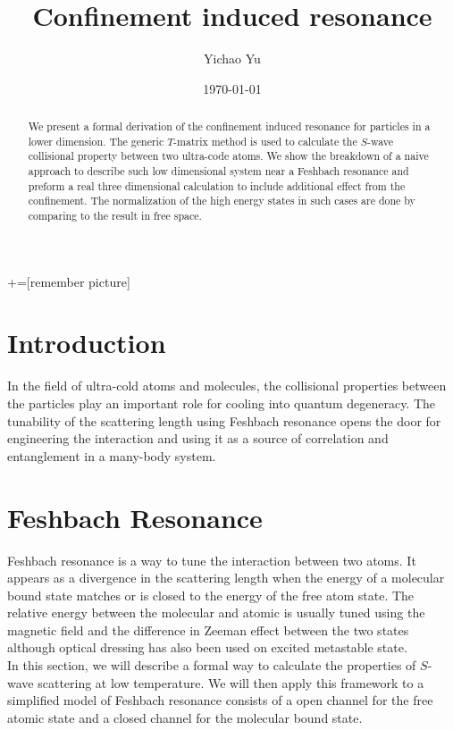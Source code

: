 \documentclass[aps,twocolumn,secnumarabic,balancelastpage,amsmath,amssymb,nofootinbib]{revtex4}
\begin{document}
+=[remember picture]
\title{Confinement induced resonance}
\author{Yichao Yu}
\date{\today}

\begin{abstract}
  We present a formal derivation of the confinement induced resonance for particles in a lower dimension. The generic $T$-matrix method is used to calculate the $S$-wave collisional property between two ultra-code atoms. We show the breakdown of a naive approach to describe such low dimensional system near a Feshbach resonance and preform a real three dimensional calculation to include additional effect from the confinement. The normalization of the high energy states in such cases are done by comparing to the result in free space.
\end{abstract}

\maketitle
\section{Introduction}
In the field of ultra-cold atoms and molecules, the collisional properties between the particles play an important role for cooling into quantum degeneracy. The tunability of the scattering length using Feshbach resonance opens the door for engineering the interaction and using it as a source of correlation and entanglement in a many-body system.


\section{Feshbach Resonance}
Feshbach resonance is a way to tune the interaction between two atoms. It appears as a divergence in the scattering length when the energy of a molecular bound state matches or is closed to the energy of the free atom state. The relative energy between the molecular and atomic is usually tuned using the magnetic field and the difference in Zeeman effect between the two states although optical dressing has also been used on excited metastable state.\\

In this section, we will describe a formal way to calculate the properties of $S$-wave scattering at low temperature. We will then apply this framework to a simplified model of Feshbach resonance consists of a open channel for the free atomic state and a closed channel for the molecular bound state.
\end{document}
